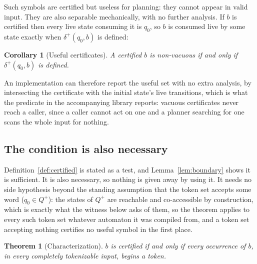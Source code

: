 \documentclass[11pt,a4paper]{article}
\theoremstyle{definition}
\theoremstyle{plain}
\newtheorem{theorem}{Theorem}
\newtheorem{corollary}{Corollary}
\begin{document}
Such symbols are certified but useless for planning: they cannot appear in valid input. They are also separable
mechanically, with no further analysis. If $b$ is certified then every live state consuming it is $q_0$, so $b$ is
consumed live by some state exactly when $\delta^+(q_0, b)$ is defined:

\begin{corollary}[Useful certificates]
\label{cor:useful}
A certified $b$ is non-vacuous if and only if $\delta^+(q_0, b)$ is defined.
\end{corollary}

An implementation can therefore report the useful set with no extra analysis, by intersecting the certificate with the
initial state's live transitions, which is what the predicate in the accompanying library reports: vacuous
certificates never reach a caller, since a caller cannot act on one and a planner searching for one scans the whole
input for nothing.

\subsection{The condition is also necessary}
\label{sec:necessity}

Definition~\ref{def:certified} is stated as a test, and Lemma~\ref{lem:boundary} shows it is sufficient. It is also
necessary, so nothing is given away by using it. It needs no side hypothesis beyond the standing assumption that the
token set accepts some word ($q_0 \in Q^+$): the states of $Q^+$ are reachable and co-accessible by construction, which
is exactly what the witness below asks of them, so the theorem applies to every such token set whatever automaton it was
compiled from, and a token set accepting nothing certifies no useful symbol in the first place.

\begin{theorem}[Characterization]
\label{thm:necessity}
$b$ is certified if and only if every occurrence of $b$, in every completely tokenizable input, begins a token.
\end{theorem}
\end{document}
